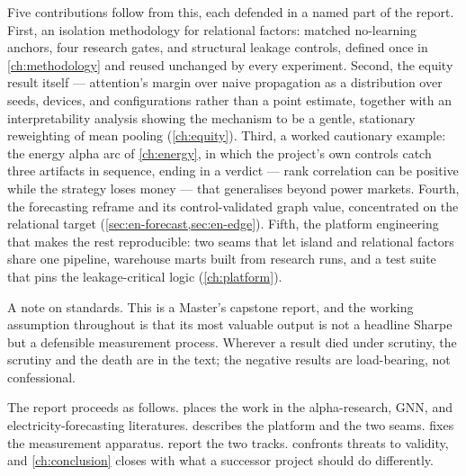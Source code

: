 Five contributions follow from this, each defended in a named part of
the report. First, an isolation methodology for relational factors:
matched no-learning anchors, four research gates, and structural
leakage controls, defined once in \cref{ch:methodology} and reused
unchanged by every experiment. Second, the equity result itself ---
attention's margin over naive propagation as a distribution over seeds,
devices, and configurations rather than a point estimate, together with
an interpretability analysis showing the mechanism to be a gentle,
stationary reweighting of mean pooling (\cref{ch:equity}). Third, a
worked cautionary example: the energy alpha arc of
\cref{ch:energy}, in which the project's own controls catch three
artifacts in sequence, ending in a verdict --- rank correlation can be
positive while the strategy loses money --- that generalises beyond
power markets. Fourth, the forecasting reframe and its control-validated
graph value, concentrated on the relational target
(\cref{sec:en-forecast,sec:en-edge}). Fifth, the platform engineering
that makes the rest reproducible: two seams that let island and
relational factors share one pipeline, warehouse marts built from
research runs, and a test suite that pins the leakage-critical logic
(\cref{ch:platform}).

A note on standards. This is a Master's capstone report, and the working
assumption throughout is that its most valuable output is not a
headline Sharpe but a defensible measurement process. Wherever a result
died under scrutiny, the scrutiny and the death are in the text; the
negative results are load-bearing, not confessional.

The report proceeds as follows.  places the work in
the alpha-research, GNN, and electricity-forecasting literatures.
 describes the platform and the two seams.
 fixes the measurement apparatus.
 report the two tracks.
 confronts threats to validity, and
\cref{ch:conclusion} closes with what a successor project should do
differently.
